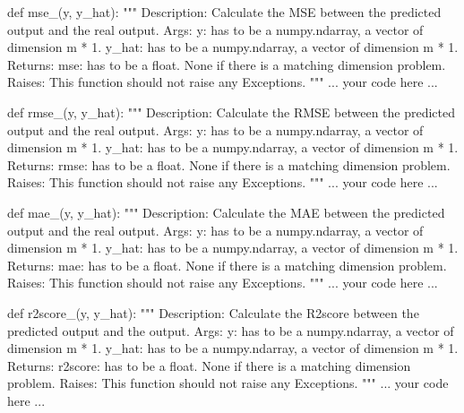\documentclass[]{article}
\newenvironment{Shaded}{\begin{snugshade}}{\end{snugshade}}
\newcommand{\CommentTok}[1]{\textcolor[rgb]{0.48,0.49,0.49}{#1}}
\newcommand{\KeywordTok}[1]{\textcolor[rgb]{0.81,0.81,0.76}{#1}}
\newcommand{\NormalTok}[1]{\textcolor[rgb]{0.81,0.81,0.76}{#1}}
\begin{document}
\begin{Shaded}
\begin{Highlighting}[]
\KeywordTok{def}\NormalTok{ mse_(y, y_hat):}
    \CommentTok{"""}
\CommentTok{    Description:}
\CommentTok{        Calculate the MSE between the predicted output and the real output.}
\CommentTok{    Args:}
\CommentTok{        y: has to be a numpy.ndarray, a vector of dimension m * 1.}
\CommentTok{        y_hat: has to be a numpy.ndarray, a vector of dimension m * 1.      }
\CommentTok{    Returns:}
\CommentTok{        mse: has to be a float.}
\CommentTok{        None if there is a matching dimension problem.}
\CommentTok{    Raises:}
\CommentTok{        This function should not raise any Exceptions.}
\CommentTok{    """}
\NormalTok{        ... your code here ...}

\KeywordTok{def}\NormalTok{ rmse_(y, y_hat):}
    \CommentTok{"""}
\CommentTok{    Description:}
\CommentTok{        Calculate the RMSE between the predicted output and the real output.}
\CommentTok{    Args:}
\CommentTok{            y: has to be a numpy.ndarray, a vector of dimension m * 1.}
\CommentTok{        y_hat: has to be a numpy.ndarray, a vector of dimension m * 1.      }
\CommentTok{    Returns:}
\CommentTok{        rmse: has to be a float.}
\CommentTok{        None if there is a matching dimension problem.}
\CommentTok{    Raises:}
\CommentTok{        This function should not raise any Exceptions.}
\CommentTok{    """}
\NormalTok{        ... your code here ...}

\KeywordTok{def}\NormalTok{ mae_(y, y_hat):}
    \CommentTok{"""}
\CommentTok{    Description:}
\CommentTok{        Calculate the MAE between the predicted output and the real output.}
\CommentTok{    Args:}
\CommentTok{        y: has to be a numpy.ndarray, a vector of dimension m * 1.}
\CommentTok{        y_hat: has to be a numpy.ndarray, a vector of dimension m * 1.      }
\CommentTok{    Returns:}
\CommentTok{        mae: has to be a float.}
\CommentTok{        None if there is a matching dimension problem.}
\CommentTok{    Raises:}
\CommentTok{        This function should not raise any Exceptions.}
\CommentTok{    """}
\NormalTok{        ... your code here ...}
    
\KeywordTok{def}\NormalTok{ r2score_(y, y_hat):}
    \CommentTok{"""}
\CommentTok{    Description:}
\CommentTok{        Calculate the R2score between the predicted output and the output.}
\CommentTok{    Args:}
\CommentTok{        y: has to be a numpy.ndarray, a vector of dimension m * 1.}
\CommentTok{        y_hat: has to be a numpy.ndarray, a vector of dimension m * 1.      }
\CommentTok{    Returns:}
\CommentTok{        r2score: has to be a float.}
\CommentTok{        None if there is a matching dimension problem.}
\CommentTok{    Raises:}
\CommentTok{        This function should not raise any Exceptions.}
\CommentTok{    """}
\NormalTok{        ... your code here ...}
\end{Highlighting}
\end{Shaded}
\end{document}
